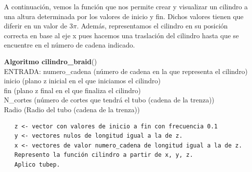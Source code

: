  \bigskip
 A continuación, vemos la función que nos permite crear y visualizar un cilindro a una altura determinada por los valores de inicio y fin. Dichos valores tienen que diferir en un valor de 3$ \pi $. Además, representamos el cilindro en su posición correcta en base al eje x pues hacemos una traslación del cilindro hasta que se encuentre en el número de cadena indicado.
  \begin{alg}
  	\textbf{Algoritmo cilindro\_braid}()\\
  	ENTRADA: numero\_cadena (número de cadena en la que representa el cilindro)\\
  	\hspace*{2.2cm} inicio (plano z inicial en el que iniciamos el cilindro)\\
  	\hspace*{2.2cm} fin (plano z final en el que finaliza el cilindro)\\
  	\hspace*{2.2cm} N\_cortes (número de cortes que tendrá el tubo (cadena de la trenza))\\
  	\hspace*{2.2cm} Radio (Radio del tubo (cadena de la trenza))
  	
\begin{lstlisting}
   z <- vector con valores de inicio a fin con frecuencia 0.1
   y <- vectores nulos de longitud igual a la de z. 
   x <- vectores de valor numero_cadena de longitud igual a la de z. 
   Represento la función cilindro a partir de x, y, z. 
   Aplico tubep. 
\end{lstlisting}
  \end{alg}
  
